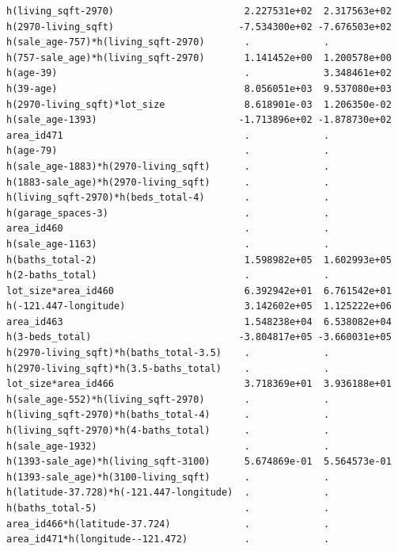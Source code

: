 \documentclass[
]{article}
\begin{document}
\begin{verbatim}
h(living_sqft-2970)                       2.227531e+02  2.317563e+02
h(2970-living_sqft)                      -7.534300e+02 -7.676503e+02
h(sale_age-757)*h(living_sqft-2970)       .             .           
h(757-sale_age)*h(living_sqft-2970)       1.141452e+00  1.200578e+00
h(age-39)                                 .             3.348461e+02
h(39-age)                                 8.056051e+03  9.537080e+03
h(2970-living_sqft)*lot_size              8.618901e-03  1.206350e-02
h(sale_age-1393)                         -1.713896e+02 -1.878730e+02
area_id471                                .             .           
h(age-79)                                 .             .           
h(sale_age-1883)*h(2970-living_sqft)      .             .           
h(1883-sale_age)*h(2970-living_sqft)      .             .           
h(living_sqft-2970)*h(beds_total-4)       .             .           
h(garage_spaces-3)                        .             .           
area_id460                                .             .           
h(sale_age-1163)                          .             .           
h(baths_total-2)                          1.598982e+05  1.602993e+05
h(2-baths_total)                          .             .           
lot_size*area_id460                       6.392942e+01  6.761542e+01
h(-121.447-longitude)                     3.142602e+05  1.125222e+06
area_id463                                1.548238e+04  6.538082e+04
h(3-beds_total)                          -3.804817e+05 -3.660031e+05
h(2970-living_sqft)*h(baths_total-3.5)    .             .           
h(2970-living_sqft)*h(3.5-baths_total)    .             .           
lot_size*area_id466                       3.718369e+01  3.936188e+01
h(sale_age-552)*h(living_sqft-2970)       .             .           
h(living_sqft-2970)*h(baths_total-4)      .             .           
h(living_sqft-2970)*h(4-baths_total)      .             .           
h(sale_age-1932)                          .             .           
h(1393-sale_age)*h(living_sqft-3100)      5.674869e-01  5.564573e-01
h(1393-sale_age)*h(3100-living_sqft)      .             .           
h(latitude-37.728)*h(-121.447-longitude)  .             .           
h(baths_total-5)                          .             .           
area_id466*h(latitude-37.724)             .             .           
area_id471*h(longitude--121.472)          .             .           
                                                                    

\end{verbatim}
\end{document}
